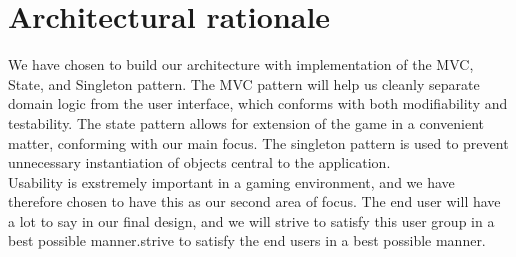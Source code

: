 \section{Architectural rationale}

We have chosen to build our architecture with implementation of the MVC, State, and Singleton pattern. The MVC pattern will help us cleanly separate domain logic from the user interface, which conforms with both modifiability and testability. The state pattern allows for extension of the game in a convenient matter, conforming with our main focus. The singleton pattern is used to prevent unnecessary instantiation of objects central to the application. \\

Usability is exstremely important in a gaming environment, and we have therefore chosen to have this as our second area of focus. The end user will have a lot to say in our final design, and we will strive to satisfy this user group in a best possible manner.strive to satisfy the end users in a best possible manner.